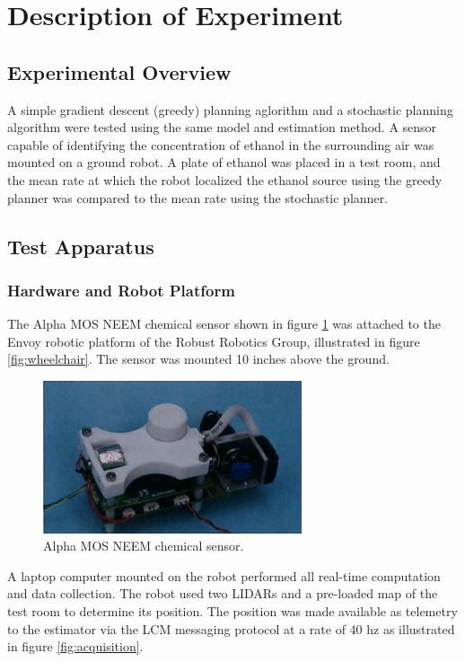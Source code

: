 \documentclass[submit]{aiaa-pretty-modified}
\begin{document}
\section{Description of Experiment}
\subsection{Experimental Overview}
A simple gradient descent (greedy) planning aglorithm and a
stochastic planning algorithm were tested using the
same model and estimation method. A sensor capable of identifying the
concentration of ethanol in the surrounding air was mounted on a ground
robot. A plate of ethanol was placed in a test room, and the mean rate at which the robot localized the ethanol source
using the greedy planner was compared to the mean rate using the
stochastic planner.

\subsection{Test Apparatus}
\label{sec:design}
\subsubsection{Hardware and Robot Platform}

The Alpha MOS NEEM chemical sensor shown in figure \ref{fig:sensor} was
attached to the Envoy robotic platform of the Robust Robotics Group, illustrated in figure \ref{fig:wheelchair}.  The sensor was mounted
10 inches above the ground.


\begin{figure}
\begin{center}
\includegraphics[width=3in]{img/sensor.pdf}
\caption{Alpha MOS NEEM chemical sensor.}
\label{fig:sensor}
\end{center}
\end{figure}

A laptop computer
mounted on the robot performed all real-time computation and data
collection.  The robot used two LIDARs and a pre-loaded map of the
test room to determine its position.  The position was made available
as telemetry to the estimator via the LCM messaging protocol at a rate
of 40 hz as
illustrated in figure \ref{fig:acquisition}.
\end{document}
